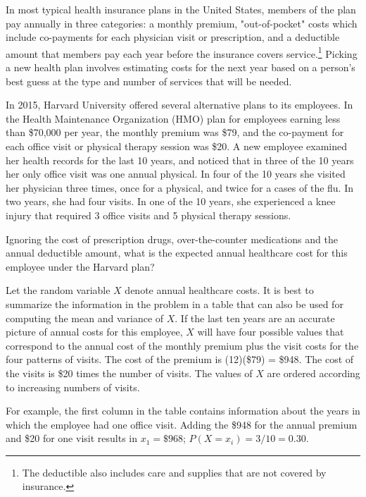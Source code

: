 \begin{example} \label{healthCareCostsEmployee}
{In most typical health insurance plans in the United States, members of the plan pay annually in three categories: a monthly premium, "out-of-pocket" costs which include co-payments for each physician visit or prescription, and a deductible amount that members pay each year before the insurance covers service.\footnote{The deductible also includes care and supplies that are not covered by insurance.} Picking a new health plan involves estimating costs for the next year based on a person's best guess at the type and number of services that will be needed.
	
In 2015, Harvard University offered several alternative plans to its employees.   In the Health Maintenance Organization (HMO) plan for employees earning less than \$70,000 per year, the monthly premium was \$79, and the co-payment for each office visit or physical therapy session was \$20. A new employee examined her health records for the last 10 years, and noticed that in three of the 10 years her only office visit was one annual physical.  In four of the 10 years she visited her physician three times, once for a physical, and twice for a cases of the flu. In two years, she had four visits.  In one of the 10 years, she experienced a knee injury that required 3 office visits and 5 physical therapy sessions.

Ignoring the cost of prescription drugs, over-the-counter medications and the annual deductible amount, what is the expected annual healthcare cost for this employee under the Harvard plan?}  

Let the random variable $X$ denote annual healthcare costs.  It is best to summarize the information in the problem in a table that can also be used for computing the mean and variance of $X$.  If the  last ten years are an accurate picture of annual costs for this employee, $X$ will have four possible values that correspond to the annual cost of the monthly premium plus the visit costs for the four patterns of visits.  The cost of the premium is (12)(\$79) = \$948. The cost of the visits is \$20 times the number of visits.  The values of $X$ are ordered according to increasing numbers of visits. 

For example, the first column in the table contains information about the years in which the employee had one office visit. Adding the \$948 for the annual premium and \$20 for one visit results in $x_{1}=\$968$; $P(X=x_{i}) = 3/10 = 0.30$.


\end{example}
